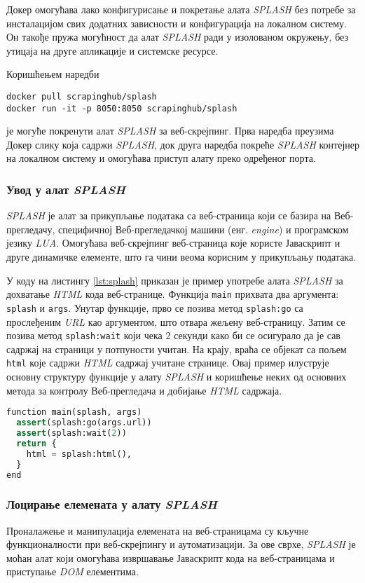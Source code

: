 \documentclass[12pt,oneside]{memoir}
\begin{document}
Докер омогућава лако конфигурисање и покретање алата \textit{SPLASH} без потребе за инсталацијом свих додатних зависности и конфигурација на локалном систему. Он такође пружа могућност да алат \textit{SPLASH} ради у изолованом окружењу, без утицаја на друге апликације и системске ресурсе.

Коришћењем наредби 
\begin{verbatim}
docker pull scrapinghub/splash
docker run -it -p 8050:8050 scrapinghub/splash  
\end{verbatim}
је могуће покренути алат \textit{SPLASH} за веб-скрејпинг. Прва наредба преузима Докер слику која садржи \textit{SPLASH}, док друга наредба покреће \textit{SPLASH} контејнер на локалном систему и омогућава приступ алату преко одређеног порта.

\subsubsection{Увод у алат \textit{SPLASH}}
\textit{SPLASH} је алат за прикупљање података са веб-страница који се базира на Веб-прегледачу, специфичној Веб-прегледачкој машини (енг. \textit{engine}) и програмском језику \textit{LUA}. Омогућава веб-скрејпинг веб-страница које користе Јаваскрипт и друге динамичке елементе, што га чини веома корисним у прикупљању података.

У коду на листингу \ref{lst:splash} приказан је пример употребе алата \textit{SPLASH} за дохватање \textit{HTML} кода веб-странице. Функција \texttt{main} прихвата два аргумента: \texttt{splash} и \texttt{args}. Унутар функције, прво се позива метод \texttt{splash:go} са прослеђеним \textit{URL} као аргументом, што отвара жељену веб-страницу. Затим се позива метод \texttt{splash:wait} који чека 2 секунди како би се осигурало да је сав садржај на страници у потпуности учитан. На крају, враћа се објекат са пољем \texttt{html} које садржи \textit{HTML} садржај учитане странице. Овај пример илуструје основну структуру функције у алату \textit{SPLASH} и коришћење неких од основних метода за контролу Веб-прегледача и добијање \textit{HTML} садржаја.
\begin{lstlisting}[language=Python, caption={Пример употребе алата \textit{SPLASH}}, label={lst:splash}]
function main(splash, args)
  assert(splash:go(args.url))
  assert(splash:wait(2))
  return {
    html = splash:html(),
  }
end
\end{lstlisting}

\subsubsection{Лоцирање елемената у алату \textit{SPLASH}}
Проналажење и манипулација елемената на веб-страницама су кључне функционалности при веб-скрејпингу и аутоматизацији. За ове сврхе, \textit{SPLASH} је моћан алат који омогућава извршавање Јаваскрипт кода на веб-страницама и приступање \textit{DOM} елементима.
\end{document}
